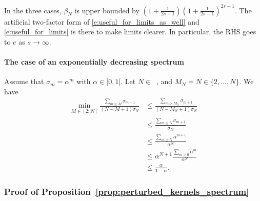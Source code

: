 \documentclass[twoside,11pt]{book}
\numberwithin{theorem}{chapter}
\numberwithin{definition}{chapter}
\numberwithin{proposition}{chapter}
\numberwithin{corollary}{chapter}
\numberwithin{example}{chapter}
\numberwithin{lemma}{chapter}
\DeclareMathOperator{\Ns}{\mathbb{N}^{*}}
\begin{document}

In the three cases, $\beta_{N}$ is upper bounded by $\left(1+\frac{1}{2s-1}\right) \left(1+\frac{1}{2s-1}\right)^{2s-1}$. The artificial two-factor form of \eqref{e:useful_for_limits_as_well} and \eqref{e:useful_for_limits} is there to make limits clearer. In particular, the RHS goes to $e$ as $s\rightarrow \infty$.

\paragraph{The case of an exponentially decreasing spectrum}
Assume that $\sigma_{m} = \alpha^{m}$ with $\alpha \in [0,1[$.
Let $N \in \Ns$, and $M_N = N \in \{ 2,\dots, N\}$.
We have
\begin{align}
\min_{M \in [2:N]}\frac{\sum_{m \geq M} \sigma_{m+1}}{(N-M+1)\sigma_N}
& \leq \frac{\sum_{m \geq M_N} \sigma_{m+1}}{(N-M_N+1)\sigma_N}\\
& \leq \frac{\sum_{m \geq N} \sigma_{m+1}}{\sigma_N}\\
& \leq \frac{\sum_{m \geq N} \alpha^{m+1}}{\alpha^{N}}\\
& \leq \alpha^{N+1}\frac{\sum_{m \geq 0} \alpha^{m}}{\alpha^{N}}\\
& \leq \frac{\alpha}{1-\alpha}.
\end{align}

\subsubsection{Proof of Proposition~\ref{prop:perturbed_kernels_spectrum}}\label{app:proof_perturbed_kernels_spectrum}
\end{document}
